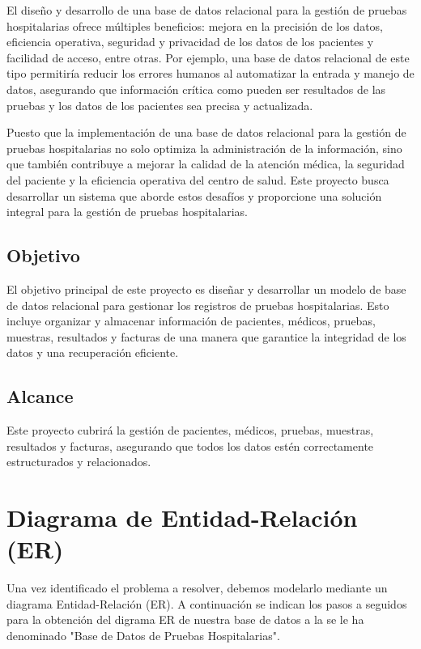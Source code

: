 \documentclass[spanish]{article}
\begin{document}
El diseño y desarrollo de una base de datos relacional para la gestión de pruebas hospitalarias ofrece múltiples beneficios: mejora en la precisión de los datos, eficiencia operativa, seguridad y privacidad de los datos de los pacientes y facilidad de acceso, entre otras. Por ejemplo, una base de datos relacional de este tipo permitiría reducir los errores humanos al automatizar la entrada y manejo de datos, asegurando que información crítica como pueden ser resultados de las pruebas y los datos de los pacientes sea precisa y actualizada. 

Puesto que la implementación de una base de datos relacional para la gestión de pruebas hospitalarias no solo optimiza la administración de la información, sino que también contribuye a mejorar la calidad de la atención médica, la seguridad del paciente y la eficiencia operativa del centro de salud. Este proyecto busca desarrollar un sistema que aborde estos desafíos y proporcione una solución integral para la gestión de pruebas hospitalarias.

\subsection{Objetivo}

El objetivo principal de este proyecto es diseñar y desarrollar un modelo de base de datos relacional para gestionar los registros de pruebas hospitalarias. Esto incluye organizar y almacenar información de pacientes, médicos, pruebas, muestras, resultados y facturas de una manera que garantice la integridad de los datos y una recuperación eficiente.

\subsection{Alcance}

Este proyecto cubrirá la gestión de pacientes, médicos, pruebas, muestras, resultados y facturas, asegurando que todos los datos estén correctamente estructurados y relacionados.

\newpage
\section{Diagrama de Entidad-Relación (ER)}
Una vez identificado el problema a resolver, debemos modelarlo mediante un diagrama Entidad-Relación (ER). A continuación se indican los pasos a seguidos para la obtención del digrama ER de nuestra base de datos a la se le ha denominado "Base de Datos de Pruebas Hospitalarias".
\end{document}
